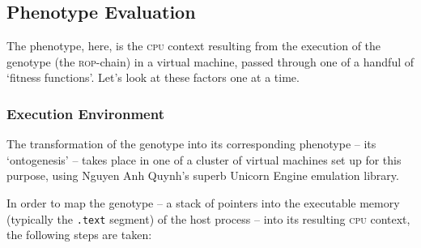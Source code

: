 




\subsection{Phenotype Evaluation}
The phenotype, here, is the \textsc{cpu} context resulting from the execution of the genotype (the \textsc{rop}-chain) in a virtual machine, passed through one of a handful of `fitness functions'. Let's look at these factors one at a time. 
\subsubsection{Execution Environment}
The transformation of the genotype into its corresponding phenotype -- its `ontogenesis' -- takes place in one of a cluster of virtual machines set up for this purpose, using Nguyen Anh Quynh's superb Unicorn Engine emulation library.

In order to map the genotype -- a stack of pointers into the executable memory (typically the \texttt{.text} segment) of the host process -- into its resulting \textsc{cpu} context, the following steps are taken:

